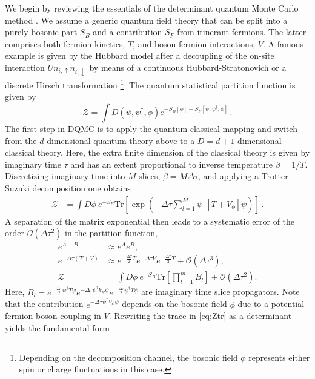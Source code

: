 \documentclass[submission, Phys]{SciPost}
\begin{document}
We begin by reviewing the essentials of the determinant quantum Monte Carlo method \cite{Blankenbecler1981, Loh2005, Scalapino1993, Santos2003, Assaad2002a}. We assume a generic quantum field theory that can be split into a purely bosonic part $S_B$ and a contribution $S_F$ from itinerant fermions. The latter comprises both fermion kinetics, $T$, and boson-fermion interactions, $V$. A famous example is given by the Hubbard model after a decoupling of the on-site
interaction $U n_{i, \uparrow} n_{i, \downarrow}$ by means of a continuous Hubbard-Stratonovich or a discrete Hirsch transformation \cite{Hirsch1983}\footnote{Depending on the decomposition channel, the bosonic field $\phi$ represents either spin or charge fluctuations in this case.}. The quantum statistical partition function is given by
%
\begin{equation}
\mathcal{Z} = \int D\left( \psi, \psi^\dagger, \phi \right) e^{-S_B[\phi] - S_F[\psi, \psi^\dagger, \phi]} \,.
\end{equation}
%
The first step in DQMC is to apply the quantum-classical mapping \cite{Sachdev2011} and switch from the $d$ dimensional quantum theory above to a $D = d + 1$ dimensional classical theory. Here, the extra finite dimension of the classical theory is given by imaginary time $\tau$ and has an extent proportional to inverse temperature $\beta = 1/T$. Discretizing imaginary time into $M$ slices, $\beta = M \Delta \tau$, and applying a Trotter-Suzuki decomposition \cite{Trotter1959, Suzuki1986} one obtains
%
\begin{align}
	\mathcal{Z} &= \int D\phi \ e^{-S_B} \mathrm{Tr}{\left[\exp{\left( -\Delta\tau \sum_{l=1}^M \psi^\dagger \left[T + V_\phi\right] \psi \right)}\right]} \label{eq:discretizedpi} \,.
\end{align}
%
A separation of the matrix exponential then leads to a systematic error of the order $\mathcal{O}\left(\Delta\tau^2\right)$ in the partition function,
\begin{align}
	e^{A + B} &\approx e^A e^B, \quad \nonumber\\
	e^{-\Delta\tau (T + V)} &\approx e^{- \frac{\Delta\tau}{2}T} e^{-\Delta\tau V} e^{- \frac{\Delta\tau}{2}T} + \mathcal{O}\left(\Delta\tau^3\right), \nonumber\\
	\mathcal{Z} &= \int D\phi \ e^{-S_B} \mathrm{Tr}{\left[ \prod_{l=1}^{m} B_l \right]} + \mathcal{O}\left(\Delta\tau^2\right). \label{eq:Ztr}
\end{align}
%
Here, $B_l = e^{- \frac{\Delta\tau}{2}\psi^\dagger T \psi} e^{-\Delta\tau \psi^\dagger V_\phi \psi} e^{- \frac{\Delta\tau}{2}\psi^\dagger T \psi}$ are imaginary time slice propagators. Note that the contribution $e^{-\Delta\tau \psi^\dagger V_\phi \psi}$ depends on the bosonic field $\phi$ due to a potential fermion-boson coupling in $V$. Rewriting the trace in \eqref{eq:Ztr} as a determinant\cite{Assaad2002a} yields the fundamental form
\end{document}
